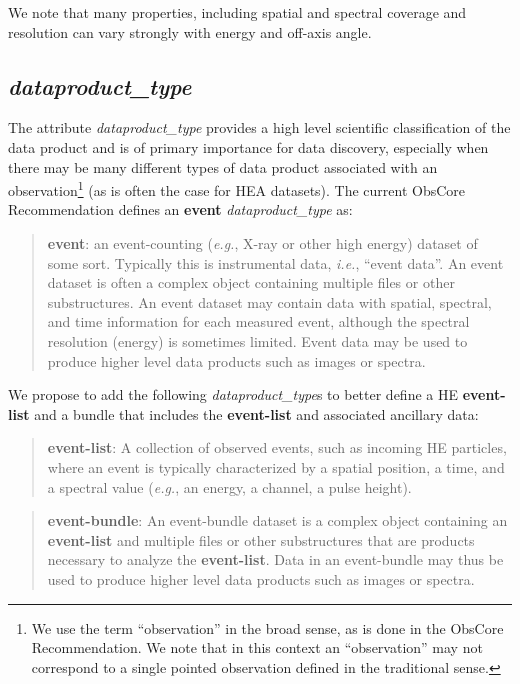\documentclass[11pt,a4paper]{ivoa}
\begin{document}
We note that many properties, including spatial and spectral coverage and resolution can vary strongly with energy and off-axis angle.

\subsection{{\em dataproduct\_type}}\label{sec:dataproduct_type}

The attribute {\em dataproduct\_type\/} provides a high level scientific classification of the data product and is of primary importance for data discovery, especially when there may be many different types of data product associated with an observation\footnote{We use the term ``observation'' in the broad sense, as is done in the ObsCore Recommendation.  We note that in this context an ``observation'' may not correspond to a single pointed observation defined in the traditional sense.} (as is often the case for HEA datasets).  The current ObsCore Recommendation defines an {\bf event} {\em dataproduct\_type} as:

\begin{quote}
{\bf event}: an event-counting ({\em e.g.\/}, X-ray or other high energy) dataset of some sort. Typically this is instrumental data, {\em i.e.\/}, ``event data''.  An event dataset is often a complex object containing multiple files or other substructures. An event dataset may contain data with spatial, spectral, and time information for each measured event, although the spectral resolution (energy) is sometimes limited. Event data may be used to produce higher level data products such as images or spectra.
\end{quote}

We propose to add the following {\em dataproduct\_type}s to better define a HE {\bf event-list} and a bundle that includes the {\bf event-list} and associated ancillary data:

\begin{quote}
{\bf event-list}: A collection of observed events, such as incoming HE particles, where an event is typically characterized by a spatial position, a time, and a spectral value ({\em e.g.\/}, an energy, a channel, a pulse height).
\end{quote}

\begin{quote}
{\bf event-bundle}: An event-bundle dataset is a complex object containing an {\bf event-list} and multiple files or other substructures that are products necessary to analyze the {\bf event-list}. Data in an event-bundle may thus be used to produce higher level data products such as images or spectra.
\end{quote}
\end{document}
